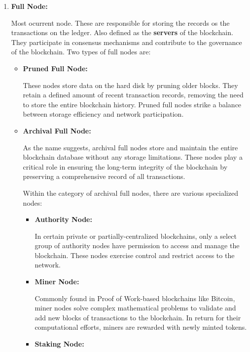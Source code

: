 \begin{enumerate}
    \item \textbf{Full Node:}

    Most ocurrent node. These are responsible for storing the records os the transactions on the ledger. Also defined as the \textbf{servers} of the blockchain. They participate in consensus mechanisms and contribute to the governance of the blockchain. Two types of full nodes are:

    \begin{itemize}
            \item \textbf{Pruned Full Node:}

     These nodes store data on the hard disk by pruning older blocks. They retain a defined amount of recent transaction records, removing the need to store the entire blockchain history. Pruned full nodes strike a balance between storage efficiency and network participation.\newline
    
    \item \textbf{Archival Full Node:}

    As the name suggests, archival full nodes store and maintain the entire blockchain database without any storage limitations. These nodes play a critical role in ensuring the long-term integrity of the blockchain by preserving a comprehensive record of all transactions.
    
Within the category of archival full nodes, there are various specialized nodes:\newline

\begin{itemize}
    \item \textbf{Authority Node:}

    In certain private or partially-centralized blockchains, only a select group of authority nodes have permission to access and manage the blockchain. These nodes exercise control and restrict access to the network.\newline
    
    \item \textbf{Miner Node:}

    Commonly found in Proof of Work-based blockchains like Bitcoin, miner nodes solve complex mathematical problems to validate and add new blocks of transactions to the blockchain. In return for their computational efforts, miners are rewarded with newly minted tokens.\newline
    \item \textbf{Staking Node:}


\end{itemize}
\end{itemize}
\end{enumerate}
